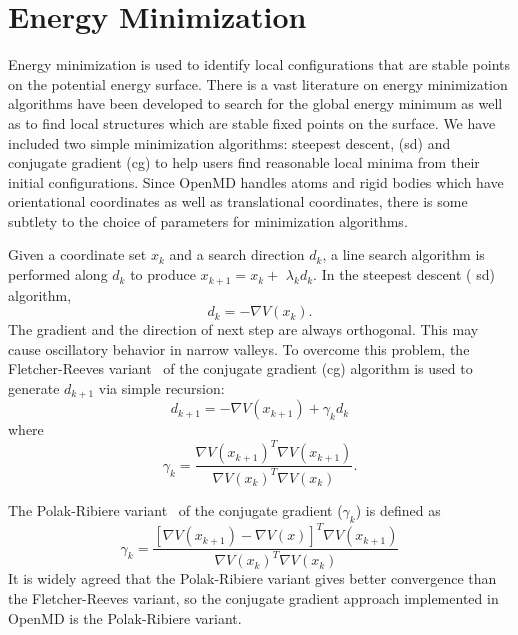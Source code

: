 \documentclass[]{book}
\begin{document}
\chapter{\label{section:minimizer}Energy Minimization}

Energy minimization is used to identify local configurations that are stable
points on the potential energy surface. There is a vast literature on
energy minimization algorithms have been developed to search for the
global energy minimum as well as to find local structures which are
stable fixed points on the surface.  We have included two simple
minimization algorithms: steepest descent, ({\sc sd}) and conjugate
gradient ({\sc cg}) to help users find reasonable local minima from
their initial configurations. Since {\sc OpenMD} handles atoms and
rigid bodies which have orientational coordinates as well as
translational coordinates, there is some subtlety to the choice of
parameters for minimization algorithms.

Given a coordinate set $x_{k}$ and a search direction $d_{k}$, a line
search algorithm is performed along $d_{k}$ to produce
$x_{k+1}=x_{k}+$ $\lambda _{k}d_{k}$. In the steepest descent ({\sc
sd}) algorithm,%
\begin{equation}
d_{k}=-\nabla V(x_{k}).
\end{equation}
The gradient and the direction of next step are always orthogonal.
This may cause oscillatory behavior in narrow valleys.  To overcome
this problem, the Fletcher-Reeves variant~\cite{FletcherReeves} of the
conjugate gradient ({\sc cg}) algorithm is used to generate $d_{k+1}$
via simple recursion:
\begin{equation}
d_{k+1}  =-\nabla V(x_{k+1})+\gamma_{k}d_{k}
\end{equation}
where
\begin{equation}
\gamma_{k}  =\frac{\nabla V(x_{k+1})^{T}\nabla V(x_{k+1})}{\nabla
V(x_{k})^{T}\nabla V(x_{k})}.
\end{equation}

The Polak-Ribiere variant~\cite{PolakRibiere} of the conjugate
gradient ($\gamma_{k}$) is defined as%
\begin{equation}
\gamma_{k}=\frac{[\nabla V(x_{k+1})-\nabla V(x)]^{T}\nabla V(x_{k+1})}{\nabla
V(x_{k})^{T}\nabla V(x_{k})}%
\end{equation}
It is widely agreed that the Polak-Ribiere variant gives better
convergence than the Fletcher-Reeves variant, so the conjugate
gradient approach implemented in {\sc OpenMD} is the Polak-Ribiere
variant.
\end{document}
